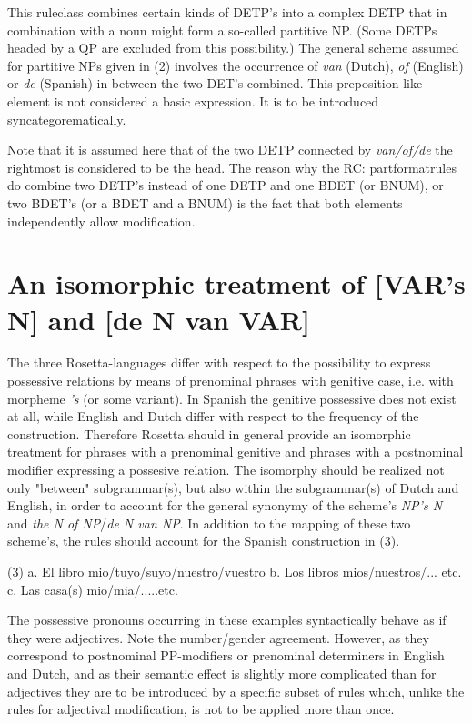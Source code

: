 This ruleclass combines certain kinds of DETP's into a complex DETP that in
combination with a noun might form a so-called partitive NP. (Some DETPs headed
by a QP are excluded from this possibility.) The general scheme assumed for
partitive NPs given in (2) involves the occurrence of {\em van} (Dutch), {\em
of} (English) or {\em de} (Spanish) in between the two DET's combined. This
preposition-like element is not considered a basic expression. It is to be
introduced syncategorematically. 

Note that it is assumed here that of the two DETP connected by {\em van/of/de}
the rightmost is considered to be the head. The reason why the RC:
partformatrules do combine two DETP's instead of one DETP and one BDET (or
BNUM), or two BDET's (or a BDET and a BNUM) is the fact that both elements 
independently allow modification. 

\section{An isomorphic treatment of [VAR's N] and [de N van VAR]}

The three Rosetta-languages differ with respect to the possibility to express
possessive relations by means of prenominal phrases with genitive case, i.e.
with morpheme {\em 's} (or some variant). In Spanish the genitive possessive
does not exist at all, while English and Dutch differ with respect to the
frequency of the construction. Therefore Rosetta should in general provide an
isomorphic treatment for phrases with a prenominal genitive and phrases with a
postnominal modifier expressing a possesive relation. The isomorphy should be
realized not only "between" subgrammar(s), but also within the subgrammar(s) of
Dutch and English, in order to account for the general synonymy of the scheme's
{\em NP's N} and {\em the N of NP}/{\em de N van NP}. In addition to the
mapping of these two scheme's, the rules should account for the Spanish
construction in (3).


  (3) a. El libro mio/tuyo/suyo/nuestro/vuestro
      b. Los libros mios/nuestros/... etc.
      c. Las casa(s) mio/mia/.....etc.

The possessive pronouns occurring in these examples syntactically behave as
if they were adjectives. Note the number/gender agreement. However, as they
correspond to postnominal PP-modifiers or prenominal determiners in English and
Dutch, and as their semantic effect is slightly more complicated than for
adjectives they are to be introduced by a specific subset of rules which,
unlike the rules for adjectival modification, is not to be applied more than
once.

